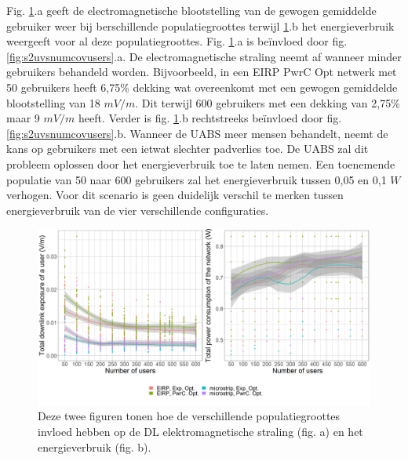 \documentclass[twocolumn]{phdsymp_dutch}
\begin{document}
Fig. \ref{fig:s2b_dlAndPc}.a geeft de electromagnetische blootstelling van de gewogen gemiddelde gebruiker weer 
bij berschillende populatiegroottes terwijl 
\ref{fig:s2b_dlAndPc}.b het energieverbruik weergeeft voor al deze populatiegroottes.
Fig. \ref{fig:s2b_dlAndPc}.a  is be\"invloed door fig. \ref{fig:s2uvsnumcovusers}.a. 
De electromagnetische straling neemt af wanneer minder gebruikers behandeld worden.
Bijvoorbeeld, in een EIRP \gls{PwrC Opt} netwerk met 50 gebruikers heeft 6,75\%
dekking wat overeenkomt met een gewogen gemiddelde blootstelling van 18 $mV/m$. Dit terwijl
 600 gebruikers met een dekking van 2,75\% maar 9 $mV/m$ heeft.
Verder is fig. \ref{fig:s2b_dlAndPc}.b rechtstreeks be\"invloed door fig.  \ref{fig:s2uvsnumcovusers}.b.
Wanneer de \gls{UABS} meer mensen behandelt, neemt de kans op gebruikers met een ietwat slechter padverlies toe.
De  \gls{UABS} zal dit probleem oplossen door het energieverbruik toe te laten nemen.
Een toenemende populatie van 50 naar 600 gebruikers zal het energieverbruik tussen 0,05 en 0,1 $W$ verhogen.
Voor dit scenario is geen duidelijk verschil te merken tussen energieverbruik van de vier verschillende configuraties.

\begin{figure}[h!]
  \includegraphics[width=\linewidth]{../results/s2/uvsdlAndPc.png} %
  \caption{Deze twee figuren tonen hoe de verschillende populatiegroottes invloed hebben op de \acs{DL} elektromagnetische straling (fig. a) en het energieverbruik (fig. b).}
  \label{fig:s2b_dlAndPc}
\end{figure}
\end{document}
